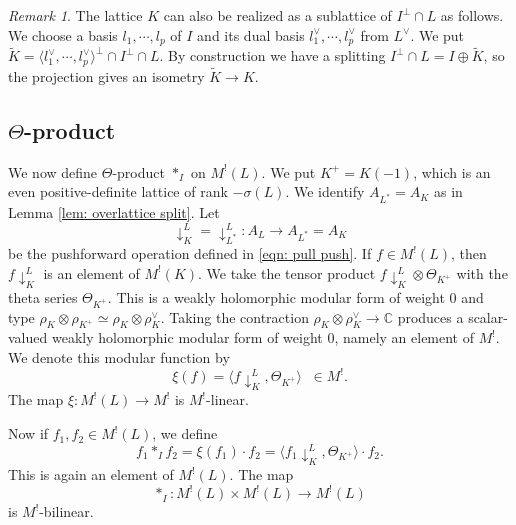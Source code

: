 \documentclass[12pt]{amsart}
\numberwithin{equation}{section}
\theoremstyle{definition}
\theoremstyle{remark}
\newtheorem{remark}[theorem]{Remark}
\newcommand{\C}{\mathbb{C}}
\newcommand{\pushLK}{\downarrow^{L}_{K}}
\newcommand{\ThetaK}{\Theta_{K^{+}}}
\newcommand{\ML}{M^{!}(L)}
\begin{document}
\begin{remark}
The lattice $K$ can also be realized as a sublattice of $I^{\perp}\cap L$ as follows. 
We choose a basis $l_1, \cdots, l_p$ of $I$ and its dual basis 
$l_1^{\vee}, \cdots, l_p^{\vee}$ from $L^{\vee}$. 
We put $\tilde{K}=\langle l_1^{\vee}, \cdots, l_p^{\vee} \rangle^{\perp} \cap I^{\perp} \cap L$. 
By construction we have a splitting 
$I^{\perp}\cap L = I \oplus \tilde{K}$, 
so the projection gives an isometry $\tilde{K}\to K$. 
\end{remark}




\subsection{$\Theta$-product}\label{ssec: theta product}


We now define $\Theta$-product $\ast_{I}$ on ${\ML}$. 
We put $K^{+}=K(-1)$, which is an even positive-definite lattice of rank $-\sigma(L)$. 
We identify $A_{L^{\ast}}=A_{K}$ as in Lemma \ref{lem: overlattice split}. 
Let 
\begin{equation*}
{\pushLK} = \downarrow^{L}_{L^{\ast}} : A_{L} \to A_{L^{\ast}} = A_{K} 
\end{equation*}
be the pushforward operation defined in \eqref{eqn: pull push}. 
If $f\in {\ML}$, then 
$f{\pushLK}$ is an element of $M^{!}(K)$. 
We take the tensor product $f{\pushLK}\otimes {\ThetaK}$ with the theta series ${\ThetaK}$.  
This is a weakly holomorphic modular form of weight $0$ and type 
$\rho_{K}\otimes \rho_{K^{+}} \simeq \rho_{K}\otimes \rho_{K}^{\vee}$. 
Taking the contraction $\rho_{K}\otimes \rho_{K}^{\vee} \to {\C}$ 
produces a scalar-valued weakly holomorphic modular form of weight $0$, 
namely an element of $M^{!}$.  
We denote this modular function by 
\begin{equation*}
\xi(f) = \langle f{\pushLK}, {\ThetaK} \rangle \; \; \in M^{!}.  
\end{equation*}
The map $\xi \colon {\ML}\to M^{!}$ is $M^{!}$-linear. 

Now if $f_1, f_2\in {\ML}$, we define 
\begin{equation*}
f_{1} \ast_{I} f_{2} = \xi(f_{1}) \cdot f_{2} = \langle f_{1}{\pushLK}, {\ThetaK} \rangle \cdot f_2. 
\end{equation*}
This is again an element of ${\ML}$. 
The map 
\begin{equation*}
\ast_{I} : {\ML} \times {\ML} \to {\ML} 
\end{equation*}
is $M^!$-bilinear. 
\end{document}
